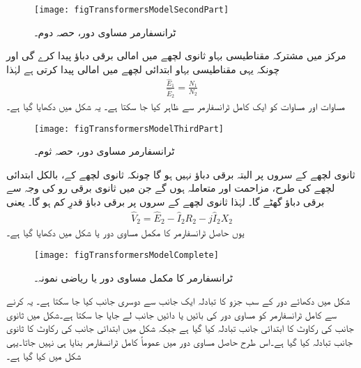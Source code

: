 \begin{figure}
\centering
\texttt{[image: figTransformersModelSecondPart]}
\caption{ٹرانسفارمر مساوی دور، حصہ دوم۔}
\label{شکل_ٹرانسفارمر_ماڈل_حصہ_دوم}
\end{figure}

مرکز میں مشترکہ مقناطیسی بہاو ثانوی لچھے میں امالی برقی دباؤ  پیدا کرے گی اور چونکہ یہی مقناطیسی بہاو ابتدائی لچھے میں   امالی پیدا کرتی ہے لہٰذا
\begin{align}\label{مساوات_ٹرانسفارمر_دباؤ_رو_شرح}
\frac{\hat{E}_1}{\hat{E}_2}=\frac{N_1}{N_2}
\end{align}
مساوات  اور مساوات   کو ایک کامل ٹرانسفارمر سے ظاہر کیا جا سکتا ہے۔ یہ شکل   میں دکھایا گیا ہے۔
\begin{figure}
\centering
\texttt{[image: figTransformersModelThirdPart]}
\caption{ٹرانسفارمر مساوی دور، حصہ ثوم۔}
\label{شکل_ٹرانسفارمر_ماڈل_حصہ_ثوم}
\end{figure}

ثانوی لچھے کے سروں پر البتہ   برقی دباؤ نہیں ہو گا چونکہ ثانوی لچھے کے، بالکل ابتدائی لچھے کی طرح، مزاحمت   اور متعاملہ   ہوں گے جن میں ثانوی برقی رو   کی وجہ سے برقی دباؤ گھٹے گا۔  لہٰذا ثانوی لچھے کے سروں پر برقی دباؤ  قدرِ کم ہو گا۔ یعنی
\begin{align}
\hat{V}_2=\hat{E}_2-\hat{I}_2 R_2-j \hat{I}_2 X_2
\end{align}
	یوں حاصل ٹرانسفارمر کا مکمل مساوی دور یا  شکل   میں دکھایا گیا ہے۔
\begin{figure}
\centering
\texttt{[image: figTransformersModelComplete]}
\caption{ٹرانسفارمر کا مکمل مساوی دور یا ریاضی نمونہ۔}
\label{شکل_ٹرانسفارمر_مکمل_ماڈل}
\end{figure}

شکل   میں دکھائے دور کے سب جزو کا تبادلہ ایک جانب سے دوسری جانب کیا جا سکتا ہے۔ یہ کرنے سے کامل ٹرانسفارمر کو مساوی دور کی بائیں یا دائیں جانب لے جایا جا سکتا ہے۔شکل    میں ثانوی جانب کی رکاوٹ کا ابتدائی جانب تبادلہ کیا گیا ہے جبکہ شکل    میں ابتدائی جانب کی رکاوٹ کا ثانوی جانب تبادلہ کیا گیا ہے۔اس طرح حاصل مساوی دور میں عموماً کامل ٹرانسفارمر بنایا ہی نہیں جاتا۔یہی شکل    میں کیا گیا ہے۔

